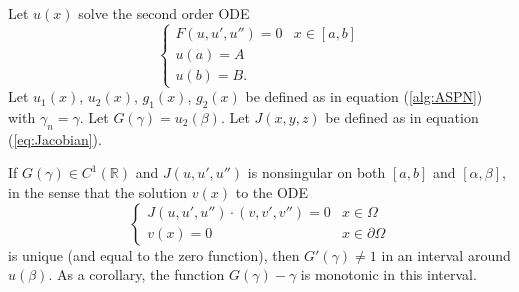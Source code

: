 \documentclass{book}
\begin{document}
\begin{thm}
Let $u(x)$ solve the second order ODE
\begin{equation*}
\begin{cases} F(u,u',u'') = 0 & x \in [a,b] \\ u(a) = A \\
u(b) = B . \end{cases}
\end{equation*}
Let $u_1(x)$, $u_2(x)$, $g_1(x)$, $g_2(x)$ be defined as in equation (\ref{alg:ASPN}) with $\gamma_n = \gamma$.
Let $G(\gamma) = u_2(\beta)$.
Let $J(x,y,z)$ be defined as in equation (\ref{eq:Jacobian}).

If $G(\gamma) \in C^1(\mathbb{R})$ and $J(u,u',u'')$ is nonsingular on both $[a,b]$ and $[\alpha,\beta]$, in the sense that the solution $v(x)$ to the ODE
\begin{equation*}
\begin{cases} J(u,u',u'') \cdot (v, v', v'') = 0 & x \in \Omega \\ v(x) = 0 & x \in \partial \Omega \end{cases}
\end{equation*}
is unique (and equal to the zero function),
then $G'(\gamma) \neq 1$ in an interval around $u(\beta)$.
As a corollary, the function $G(\gamma) - \gamma$ is monotonic in this interval.
\end{thm}
\end{document}
